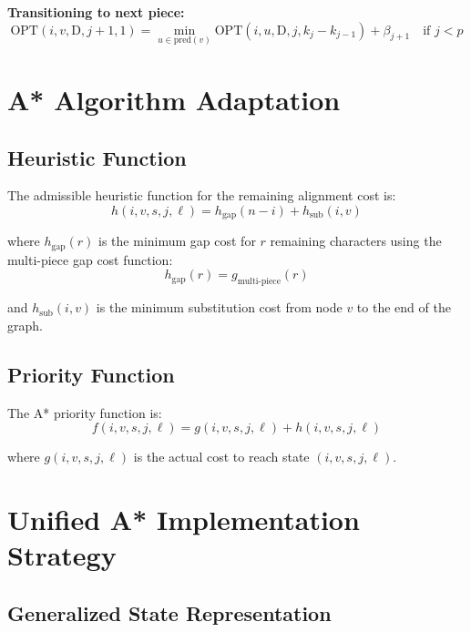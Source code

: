 \documentclass[11pt]{article}
\begin{document}
\textbf{Transitioning to next piece:}
\begin{equation}
\text{OPT}(i, v, \text{D}, j+1, 1) = \min_{u \in \text{pred}(v)} \text{OPT}(i, u, \text{D}, j, k_j - k_{j-1}) + \beta_{j+1} \quad \text{if } j < p
\end{equation}

\section{A* Algorithm Adaptation}

\subsection{Heuristic Function}

The admissible heuristic function for the remaining alignment cost is:
\begin{equation}
h(i, v, s, j, \ell) = h_{\text{gap}}(n-i) + h_{\text{sub}}(i, v)
\end{equation}

where $h_{\text{gap}}(r)$ is the minimum gap cost for $r$ remaining characters using the multi-piece gap cost function:
\begin{equation}
h_{\text{gap}}(r) = g_{\text{multi-piece}}(r)
\end{equation}

and $h_{\text{sub}}(i, v)$ is the minimum substitution cost from node $v$ to the end of the graph.

\subsection{Priority Function}

The A* priority function is:
\begin{equation}
f(i, v, s, j, \ell) = g(i, v, s, j, \ell) + h(i, v, s, j, \ell)
\end{equation}

where $g(i, v, s, j, \ell)$ is the actual cost to reach state $(i, v, s, j, \ell)$.

\section{Unified A* Implementation Strategy}

\subsection{Generalized State Representation}
\end{document}
